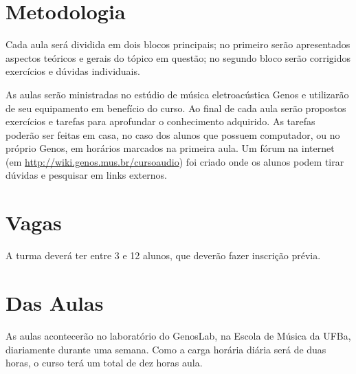 \documentclass[12pt]{article}
\begin{document}
\section{Metodologia}

Cada aula será dividida em dois blocos principais; no primeiro serão
apresentados aspectos teóricos e gerais do tópico em questão; no
segundo bloco serão corrigidos exercícios e dúvidas individuais.

As aulas serão ministradas no estúdio de música eletroacústica Genos e
utilizarão de seu equipamento em benefício do curso. Ao final de cada
aula serão propostos exercícios e tarefas para aprofundar o
conhecimento adquirido. As tarefas poderão ser feitas em casa, no caso
dos alunos que possuem computador, ou no próprio Genos, em horários
marcados na primeira aula.  Um fórum na internet (em
\url{http://wiki.genos.mus.br/cursoaudio}) foi criado onde os alunos
podem tirar dúvidas e pesquisar em links externos.

\section{Vagas}

A turma deverá ter entre 3 e 12 alunos, que deverão fazer inscrição
prévia.

\section{Das Aulas}

As aulas acontecerão no laboratório do GenosLab, na Escola de Música
da UFBa, diariamente durante uma semana. Como a carga horária diária
será de duas horas, o curso terá um total de dez horas aula.

\nocite{menezes96,dodge97:_comput_music,oliveira1995imp,menezes06:_music_maxim,vasconcelos02:_music_e_organ,laske91:_towar_epist_compos,stravinsky96:_music_em,Kramer1988,menezes01:_music_em_palav_e_sons,moore90:_elemen_of_comput_music,schaeffer93:_tratad_dos_objet_music,boulanger00:_csoun_book}



\end{document}
